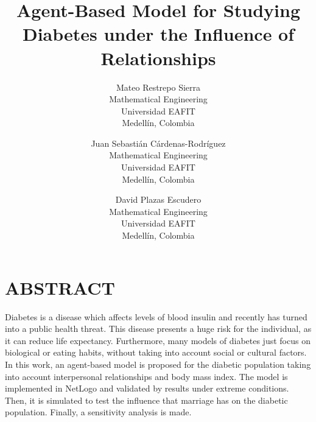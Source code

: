 \documentclass{wscpaperproc}
\theoremstyle{wsc}
\begin{document}
%
%

\title{Agent-Based Model for Studying Diabetes under the Influence of Relationships}

\author{Mateo Restrepo Sierra\\ [12pt]
Mathematical Engineering\\
Universidad EAFIT\\
Medell\'in, Colombia\\
\and
Juan Sebasti\'an C\'ardenas-Rodr\'iguez \\[12pt]
Mathematical Engineering\\
Universidad EAFIT\\
Medell\'in, Colombia\\
\and
David Plazas Escudero\\ [12pt]
Mathematical Engineering\\
Universidad EAFIT\\
Medell\'in, Colombia
}






\maketitle

\section*{ABSTRACT}
Diabetes is a disease which affects levels of blood insulin and recently has
turned into a public health threat. This disease presents a huge risk for the
individual, as it can reduce life expectancy. Furthermore, many models of
diabetes just focus on biological or eating habits, without taking into account
social or cultural factors. In this work, an agent-based model is proposed for
the diabetic population taking into account interpersonal relationships and body
mass index. The model is implemented in NetLogo and validated by results under
extreme conditions. Then, it is simulated to test the influence that marriage
has on the diabetic population. Finally, a sensitivity analysis is made. \\
\end{document}
